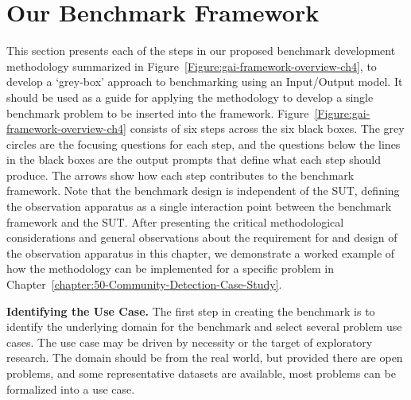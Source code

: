 \section{Our \gai Benchmark Framework}
\label{section:44-GAI-Framework}

This section presents each of the steps in our proposed benchmark development methodology summarized in Figure~\ref{Figure:gai-framework-overview-ch4}, to develop a `grey-box' approach to \gai benchmarking using an Input/Output model.
It should be used as a guide for applying the methodology to develop a single \gai benchmark problem to be inserted into the framework. 
Figure~\ref{Figure:gai-framework-overview-ch4} consists of six steps across the six black boxes. 
The grey circles are the focusing questions for each step, and the questions below the lines in the black boxes are the output prompts that define what each step should produce. 
The arrows show how each step contributes to the benchmark framework. 
Note that the \gai benchmark design is independent of the \ac{SUT}, defining the observation apparatus as a single interaction point between the \gai benchmark framework and the \ac{SUT}.
After presenting the critical methodological considerations and general observations about the requirement for and design of the observation apparatus in this chapter, we demonstrate a worked example of how the methodology can be implemented for a specific problem in Chapter~\ref{chapter:50-Community-Detection-Case-Study}. 

% 

\textbf{Identifying the Use Case.}
The first step in creating the benchmark is to identify the underlying domain for the benchmark and select several problem use cases. 
The use case may be driven by necessity or the target of exploratory research.
The domain should be from the real world, but provided there are open problems, and some representative datasets are available, most problems can be formalized into a use case. 

